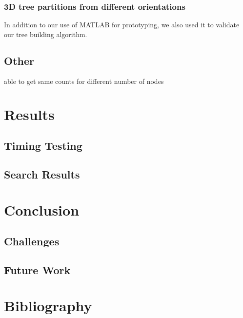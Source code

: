 \documentclass{article}
\begin{document}
\subsubsection{3D tree partitions from different orientations}
In addition to our use of MATLAB for prototyping, we also used it to validate our tree building algorithm.


\subsection{Other}
able to get same counts for different number of nodes




%
%

\section{Results}


%
%

\subsection{Timing Testing}


%
%

\subsection{Search Results}



\section{Conclusion}


\subsection{Challenges}



\subsection{Future Work}



\section{Bibliography}
\end{document}
